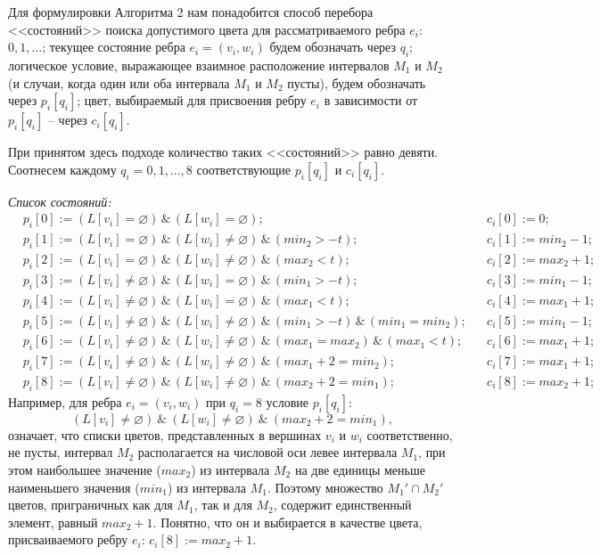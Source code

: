Для формулировки Алгоритма 2 нам понадобится способ перебора <<состояний>> поиска допустимого цвета для рассматриваемого ребра $e_i$: $0, 1, \dots$; текущее состояние ребра ${e_i= (v_i,w_i)}$ будем обозначать через $q_i$; логическое условие, выражающее взаимное расположение интервалов  $M_1$ и $M_2$ (и случаи, когда один или оба интервала $M_1$ и $M_2$ пусты), будем обозначать через $p_i[q_i]$; цвет,  выбираемый для присвоения ребру $e_i$ в зависимости от $p_i[q_i]$ -- через $c_i[q_i]$.

При принятом здесь подходе количество таких <<состояний>> равно девяти. Соотнесем каждому $q_i=0, 1, \dots, 8$ соответствующие $p_i[q_i]$   и   $c_i[q_i]$.

\vspace{6pt}
\hspace{5cm} {\textit{ Список состояний:}}
\vspace{-6pt}
\begin{align*}
   &p_i[0]:=(L[v_i]=\varnothing) \,\&\, (L[w_i]=\varnothing);    && c_i[0]:=0;\\
  &p_i[1]:=(L[v_i]=\varnothing) \,\&\, (L[w_i]\neq \varnothing) \,\&\, ( min_2>-t); &&c_i[1]:=min_2-1;\\
   &p_i[2]:=(L[v_i]=\varnothing) \,\&\, (L[w_i]\neq \varnothing) \,\&\, ( max_2<t);  &&c_i[2]:=max_2+1;\\
  &p_i[3]:=(L[v_i]\neq \varnothing) \,\&\, (L[w_i]=\varnothing) \,\&\, ( min_1>-t); &&c_i[3]:=min_1-1;\\
   &p_i[4]:=(L[v_i]\neq \varnothing) \,\&\, (L[w_i]=\varnothing) \,\&\, ( max_1<t);  &&c_i[4]:=max_1+1;\\
   &p_i[5]:=(L[v_i]\neq \varnothing) \,\&\, (L[w_i]\neq \varnothing) \,\&\, ( min_1>-t) \,\&\, (min_1=min_2); &&c_i[5]:=min_1- 1;\\
   &p_i[6]:=(L[v_i]\neq \varnothing) \,\&\, (L[w_i]\neq \varnothing) \,\&\, ( max_1=max_2) \,\&\, (max_1<t);  &&c_i[6]:=max_1+1;\\
   &p_i[7]:=(L[v_i]\neq \varnothing) \,\&\, (L[w_i]\neq \varnothing) \,\&\, ( max_1+2=min_2); &&c_i[7]:=max_1+1;\\
  &p_i[8]:=(L[v_i]\neq \varnothing) \,\&\, (L[w_i]\neq \varnothing) \,\&\, ( max_2+2=min_1); &&c_i[8]:=max_2+1;
\end{align*}
Например, для ребра ${e_i=(v_i,w_i)}$ при $q_i=8$ условие $p_i[q_i]$:
$$(L[v_i]\neq \varnothing)\ \&\ (L[w_i]\neq \varnothing)\ \&\ (max_2+2=min_1),$$
означает, что списки цветов, представленных в вершинах $v_i$ и  $w_i$ соответственно, не пусты, интервал $M_2$ располагается на числовой оси левее интервала $M_1$, при этом наибольшее значение ($max_2$) из интервала $M_2$ на две единицы меньше наименьшего значения ($min_1$) из интервала $M_1$. Поэтому множество $M_1'\cap M_2'$ цветов, приграничных как для $M_1$, так и для $M_2$, содержит единственный элемент, равный $max_2+1$. Понятно, что он и выбирается в качестве цвета, присваиваемого ребру $e_i$: $c_i[8]:=max_2+1$.
